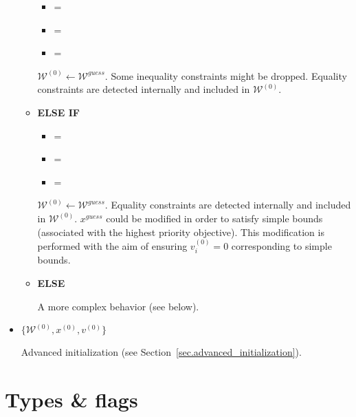 \documentclass[12pt,a4paper]{article}
\begin{document}
\begin{itemize}
\begin{itemize}
    \begin{itemize}
    \item {} = 
    \item {} = 
    \item {\color{blue} = }
    \end{itemize}
    $\mathcal{W}^{(0)} \leftarrow \mathcal{W}^{\mathit{guess}}$. Some inequality constraints
    might be dropped. Equality constraints are detected internally and included in
    $\mathcal{W}^{(0)}$.

  \item[\ding{237}] {\bf ELSE IF}

    \begin{itemize}
    \item {\color{blue} = }
    \item {} = 
    \item {} = 
    \end{itemize}
    $\mathcal{W}^{(0)} \leftarrow \mathcal{W}^{\mathit{guess}}$. Equality constraints are detected
    internally and included in $\mathcal{W}^{(0)}$. $x^{\mathit{guess}}$ could be modified in order
    to satisfy simple bounds (associated with the highest priority objective). This modification is
    performed with the aim of ensuring $v_i^{(0)} = 0$ corresponding to simple bounds.

  \item[\ding{237}] {\bf ELSE}

    A more complex behavior (see below).

  \end{itemize}

\item {\color{blue}$\{\mathcal{W}^{(0)}, x^{(0)}, v^{(0)}\}$}

  Advanced initialization (see Section~\ref{sec.advanced_initialization}).

\end{itemize}

\clearpage

\section{Types \& flags}
\end{document}
